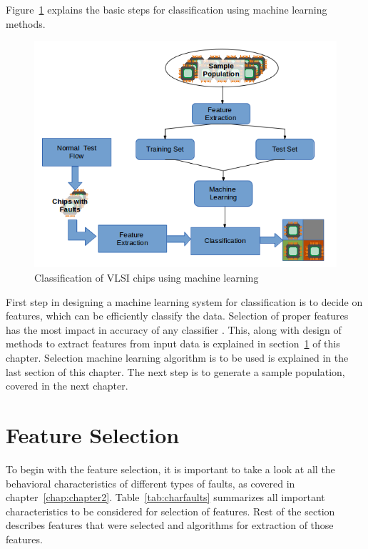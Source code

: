 Figure~\ref{fig:mlsteps} explains the basic steps for classification using machine learning methods.

\begin{figure}[h]
  \begin{center}
    \captionsetup{justification=centering}
    \includegraphics[scale=0.65]{figures/mlsteps.png}
    \caption{Classification of VLSI chips using machine learning}
    \label{fig:mlsteps}
  \end{center}
\end{figure}

First step in designing a machine learning system for classification is to decide on features, which can be efficiently classify the data. Selection of proper features has the most impact in accuracy of any classifier \cite{Michie1994}. This, along with design of methods to extract features from input data is explained in section~\ref{sec:secfs} of this chapter. Selection machine learning algorithm is to be used is explained in the last section of this chapter. The next step is to generate a sample population, covered in the next chapter.

\section{Feature Selection}
\label{sec:secfs}
To begin with the feature selection, it is important to take a look at all the behavioral characteristics of different types of faults, as covered in chapter~\ref{chap:chapter2}. Table~\ref{tab:charfaults} summarizes all important characteristics to be considered for selection of features. Rest of the section describes features that were selected and algorithms for extraction of those features.

